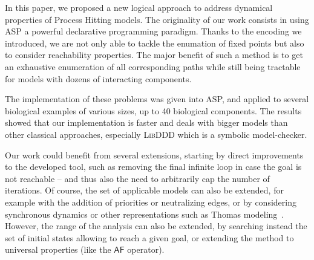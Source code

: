 In this paper, we proposed a new logical approach to address dynamical properties of Process Hitting models. The originality of our work consists in using ASP a powerful declarative programming paradigm. Thanks to the encoding we introduced, we are not only able to tackle the enumation of fixed points but also to consider reachability properties. The major benefit of such a method is to get an exhaustive enumeration of all corresponding paths while still being tractable for models with dozens of interacting components.

The implementation of these problems was given into ASP,
and applied to several biological examples of various sizes, up to
40 biological components.
The results showed that our implementation is faster and deals with bigger models
than other classical approaches, especially \textsc{LibDDD} which is a symbolic model-checker.

Our work could benefit from several extensions,
starting by direct improvements to the developed tool,
such as removing the final infinite loop in case the goal is not reachable --
and thus also the need to arbitrarily cap the number of iterations.
Of course, the set of applicable models can also be extended,
for example with the addition
of priorities or neutralizing edges,
or by considering synchronous dynamics or other representations
such as Thomas modeling~\cite{BernotSemBRN}.
However, the range of the analysis can also be extended,
by searching instead the set of initial states
allowing to reach a given goal,
or extending the method to universal properties (like the $\mathsf{AF}$ operator).
